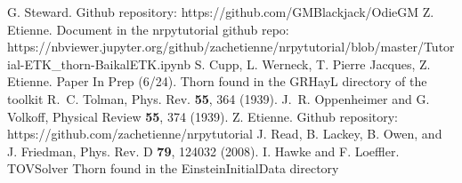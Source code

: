 \begin{thebibliography}{9}
G. Steward. Github repository: https://github.com/GMBlackjack/OdieGM
%
Z. Etienne. Document in the nrpytutorial github repo: https://nbviewer.jupyter.org/github/zachetienne/nrpytutorial/blob/master/Tutorial-ETK\_thorn-BaikalETK.ipynb
%
S. Cupp, L. Werneck, T. Pierre Jacques, Z. Etienne. Paper In Prep (6/24). Thorn found in the GRHayL directory of the toolkit
%
R.~C. Tolman, Phys. Rev. {\bf 55}, 364 (1939).
%
J.~R. Oppenheimer and G. Volkoff, Physical Review {\bf 55}, 374 (1939).
%
Z. Etienne. Github repository: https://github.com/zachetienne/nrpytutorial
%
J. Read, B. Lackey, B. Owen, and J. Friedman, Phys. Rev. D {\bf 79}, 124032 (2008).
%
I. Hawke and F. Loeffler. TOVSolver Thorn found in the EinsteinInitialData directory
%
\end{thebibliography}



